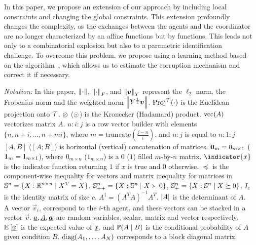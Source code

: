 \documentclass{ifacconf}  %
\begin{document}
In this paper, we propose an extension of our approach by including local constraints and changing the global constraints.
This extension profoundly changes the complexity, as the exchanges between the
agents and the coordinator are no longer characterized by an affine functions
but by \pwa{} functions.
This leads not only to a combinatorial explosion but also to a parametric identification challenge.
To overcome this problem, we propose using a learning method based on the \EM{} algorithm~\citep{DempsterEtAl1977}, which allows us to estimate the corruption
mechanism and correct it if necessary.


\emph{Notation:}
In this paper, $\left\lVert\cdot\right\rVert$, $\left\lVert\cdot\right\rVert_{F}$, and $\left\lVert\boldsymbol{v}\right\rVert_{Y}$ represent the $\ell_{2}$ norm, the Frobenius norm and the weighted norm $\left\lVert Y^{\frac{1}{2}}\boldsymbol{v}\right\rVert$.
$\operatorname{Proj}^{\mathcal{T}}(\cdot)$ is the Euclidean projection onto $\mathcal{T}$.
$\mathbin{\otimes}$ ($\odot$) is the Kronecker (Hadamard) product.
$\mathrm{vec} (A)$ vectorizes matrix $A$.
${n\mathbin{:}i\mathbin{:}j}$ is a row vector builder with elements $\{n,n+i,\dots,n+mi\}$, where ${m=\mathrm{truncate}(\frac{j-n}{i})}$, and ${n\mathbin{:}j}$ is equal to ${n\mathbin{:}1\mathbin{:}j}$.
$[A,B]$ ($[A;B]$) is horizontal (vertical) concatenation of matrices.
${\mathbf{0}_{m}=0_{m\times 1}}$ (${\mathbf{1}_{m}=1_{m\times 1}}$), where
$0_{m\times n}$ ($1_{m\times n}$) is a $0$ ($1$) filled \mbox{$m$-by-$n$} matrix.
$\indicator{x}$ is the indicator function returning $1$ if $x$ is true and $0$ otherwise.
$\preceq$ is the component-wise inequality for vectors and matrix inequality for matrices in ${\mathbb{S}^{n}=\{X:\mathbb{R}^{n\times n}\mid X^{\mathrm{T}}=X\}}$.
${\mathbb{S}_{++}^{n}=\{X:\mathbb{S}^{n}\mid X\succ 0\}}$, ${\mathbb{S}_{+}^{n}=\{X:\mathbb{S}^{n}\mid X\succeq 0\}}$.
$I_{c}$ is the identity matrix of size $c$.
$A^{\dagger}={{(A^{T}A)}^{-1}A^{T}}$.
$|A|$ is the determinant of $A$.
A vector $\vec{v}_{i}$, correspond to the $i$-th agent, and these vectors can be stacked in a vector $\vec{v}$.
$\underline{a},\underline{A},{\underline{\boldsymbol{a}}}$ are random variables, scalar, matrix and vector respectively.
$\mathbb{E}_{}\left[\underline{x}\right]$ is the expected value of $\underline{x}$, and $\mathbb{P}(A \mid B)$ is the conditional probability of $A$ given condition $B$.
${\operatorname{diag}(A_{1},\dots,A_{N})}$ corresponds to a block diagonal matrix.
\end{document}
